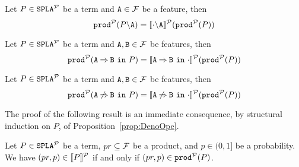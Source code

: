 Let $P\in\fodaPAp$ be a term and $\feature{A}\in\calF$ be a feature, then
  $$\prodp(\forbid{A}{P})=\semdenp{\forbid{A}{\cdot}}(\prodp(P))$$
%

Let $P\in\fodaPAp$ be a term and $\feature{A},\feature{B}\in\calF$
  be features, then
$$\prodp(\require{A}{B}{P})=\semdenp{\require{A}{B}{\cdot}}(\prodp(P))$$
%

Let $P\in\fodaPAp$ be a term and $\feature{A},\feature{B}\in\calF$
  be features, then
$$    \prodp(\exclude{A}{B}{P})=\semdenp{\exclude{A}{B}{\cdot}}(\prodp(P))$$

The proof of the following result is an immediate consequence, by structural induction on $P$, of
Proposition~\ref{prop:DenoOpe}.


\bthm\label{prop:equivprob}
  Let $P\in\fodaPAp$ be a term, $pr\subseteq\calF$ be a product, and
  $p\in(0,1]$ be a probability. We have $ (pr,p)\in\semdenp{P}$ if and only if
  $(pr,p)\in\prodp(P)$.
\ethm



